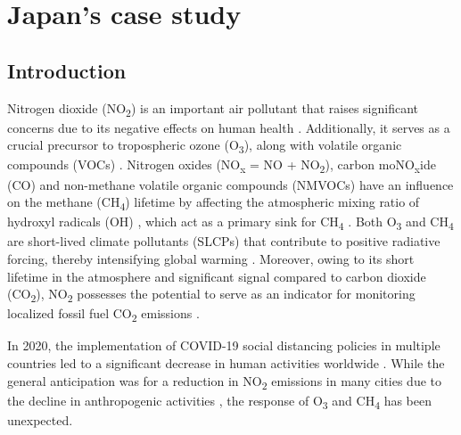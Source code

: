\chapter{Japan's case study} \label{chap4}
\renewcommand{\headrulewidth}{0pt}
\lhead[\thepage]{\leftmark}
\rhead[\leftmark]{\thepage}
\cfoot[]{}

\section{Introduction}
Nitrogen dioxide (NO\textsubscript{2}) is an important air pollutant that raises significant concerns due to its negative effects on human health \citep{hamra2015lung}. Additionally, it serves as a crucial precursor to tropospheric ozone (O\textsubscript{3}), along with volatile organic compounds (VOCs) \citep{akimoto2022rethinking}. Nitrogen oxides (NO\textsubscript{x} = NO + NO\textsubscript{2}), carbon moNO\textsubscript{x}ide (CO) and non-methane volatile organic compounds (NMVOCs) have an influence on the methane (CH\textsubscript{4}) lifetime by affecting the atmospheric mixing ratio of hydroxyl radicals (OH) \citep{akimoto2022rethinking}, which act as a primary sink for CH\textsubscript{4} \citep{turner2019interpreting}. Both O\textsubscript{3} and CH\textsubscript{4} are short-lived climate pollutants (SLCPs) that contribute to positive radiative forcing, thereby intensifying global warming \citep{akimoto2022rethinking}. Moreover, owing to its short lifetime in the atmosphere and significant signal compared to carbon dioxide (CO\textsubscript{2}), NO\textsubscript{2} possesses the potential to serve as an indicator for monitoring localized fossil fuel CO\textsubscript{2} emissions \citep{miyazaki2023predictability}. \par

In 2020, the implementation of COVID-19 social distancing policies in multiple countries led to a significant decrease in human activities worldwide \citep{de2022overview}. While the general anticipation was for a reduction in NO\textsubscript{2} emissions in many cities due to the decline in anthropogenic activities \citep{bauwens2020impact,barre2021estimating,cooper2022global}, the response of O\textsubscript{3} and CH\textsubscript{4} has been unexpected.\par

